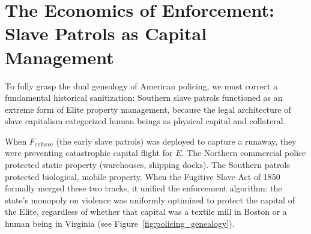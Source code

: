 \section{The Economics of Enforcement: Slave Patrols as Capital Management}

To fully grasp the dual genealogy of American policing, we must correct a fundamental historical sanitization: Southern slave patrols functioned as an extreme form of Elite property management, because the legal architecture of slave capitalism categorized human beings as physical capital and collateral.

When $F_{\text{enforce}}$ (the early slave patrols) was deployed to capture a runaway, they were preventing catastrophic capital flight for $E$. The Northern commercial police protected static property (warehouses, shipping docks). The Southern patrols protected biological, mobile property. When the Fugitive Slave Act of 1850 formally merged these two tracks, it unified the enforcement algorithm: the state's monopoly on violence was uniformly optimized to protect the capital of the Elite, regardless of whether that capital was a textile mill in Boston or a human being in Virginia (see Figure~\ref{fig:policing_genealogy}).

